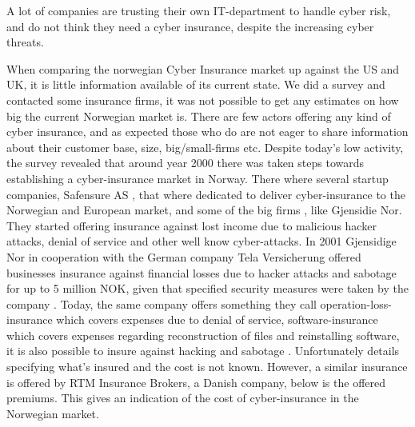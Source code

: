 A lot of companies are trusting their own IT-department to handle cyber risk, 
and do not think they need a cyber insurance, despite the increasing cyber threats. \cite{twatson}


When comparing the norwegian Cyber Insurance market up against the US and UK, 
it is little information available of its current state. We did a survey and contacted some insurance firms,
it was not possible to get any estimates on how big the current Norwegian market is. 
There are few actors offering any kind of cyber insurance, and as expected those who do are not eager to share information about their customer base, size, big/small-firms etc. 
Despite today's low activity, the survey revealed that around year 2000 there was taken steps towards
 establishing a cyber-insurance market in Norway. There where several startup companies, Safensure AS \cite{digi},
  that where dedicated to deliver cyber-insurance to the Norwegian and European market, and some of
   the big firms , like Gjensidie Nor.
They started offering insurance against lost income due to malicious hacker attacks, denial of service and other well know cyber-attacks. 
In 2001 Gjensidige Nor in cooperation with the German company Tela Versicherung offered businesses
 insurance against financial losses due to hacker attacks and sabotage for up to 5 million NOK, given that specified security measures were taken by the company \cite{dagensithackerforsikring}. 
 Today, the same company 
offers something they call operation-loss-insurance which covers expenses due to denial of service,
 software-insurance which covers expenses regarding reconstruction of files and reinstalling software,
 it is also possible to insure against hacking and sabotage \citep{gjensidige}. 
 Unfortunately details specifying what's insured and the cost is not known. However,
  a similar insurance is offered by RTM Insurance Brokers, a Danish company, below is the offered premiums. This gives an indication of the cost of cyber-insurance in the Norwegian market. \cite{RTM}


